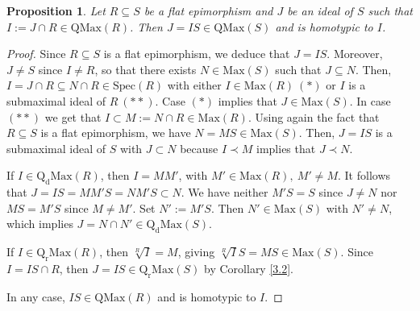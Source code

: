 \documentclass[12pt,leqno]{amsart}
\newtheorem{proposition}[theorem]{Proposition}
\theoremstyle{definition}
\begin{document}
\begin{proposition}\label{3.16} Let $R\subseteq S$ be a flat epimorphism and $J$ be an ideal of $S$ such that $I:=J\cap R\in\mathrm{QMax}(R)$. Then $J=IS\in\mathrm{QMax}(S)$ and is homotypic to $I$. 
\end{proposition}
\begin{proof} Since $R\subseteq S$ is a flat epimorphism, we deduce that $J=IS$. Moreover, $J\neq S$ since $I\neq R$, so that there exists $N\in\mathrm{Max}(S)$ such that $J\subseteq N$. Then, $I=J\cap R\subseteq N\cap R\in\mathrm{Spec}(R)$ with either $I\in\mathrm{Max}(R)\ (*)$ or $I$ is a submaximal ideal of $R\ (**)$. Case $(*)$ implies that $J\in\mathrm{Max}(S)$. In case $(**)$ we get that $I\subset M:=N\cap R\in\mathrm{Max}(R)$. Using again the fact that $R\subseteq S$ is a flat epimorphism, we have $ N=MS\in\mathrm{Max}(S)$. Then, $J=IS$ is a submaximal ideal of $S$ with $J\subset N$ because $I\prec M$ implies that $J\prec N$. 
 
If $I\in\mathrm{Q_dMax}(R)$, then $I=M M'$, with $M'\in\mathrm{Max}(R),\ M'\neq M$. It follows that $J=IS=MM'S=NM'S\subset N$. We have neither $M'S=S$ since $J\neq N$ nor $MS=M'S$ since $M\neq M'$. Set $N':=M'S$. Then $N'\in\mathrm{Max}(S)$ with $N'\neq N$, which implies $J=N\cap N'\in \mathrm{Q_dMax}(S)$. 
 
If $I\in\mathrm{Q_rMax}(R)$, then $\sqrt[R]I=M$, giving $\sqrt[R]IS=MS\in\mathrm{Max}(S)$. Since $I=IS\cap R$, then $J=IS\in\mathrm{Q_rMax}(S)$ by Corollary \ref{3.2}. 
 
In any case, $IS\in\mathrm{QMax}(R)$ and is homotypic to $I$.
\end{proof}
\end{document}
